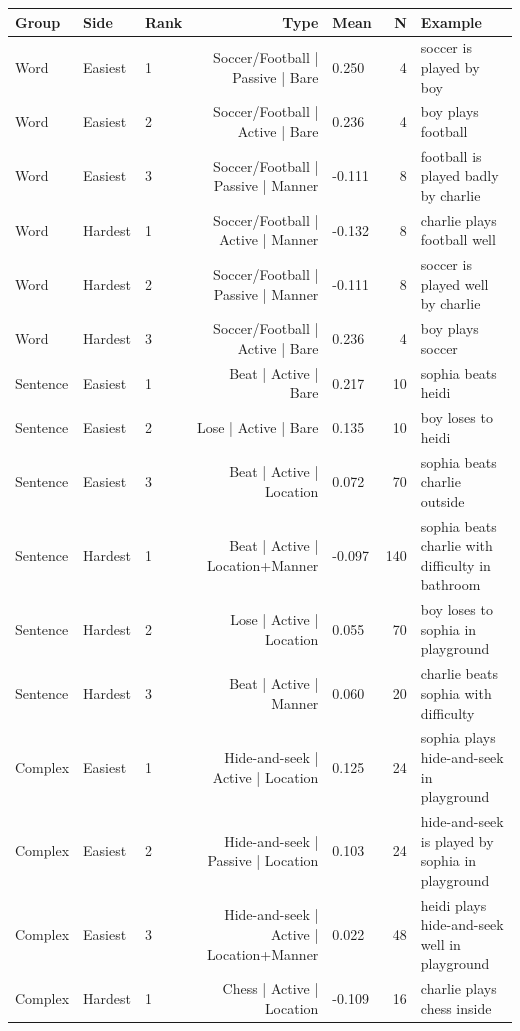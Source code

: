 \begin{table}[t]
\centering\scriptsize
\begin{tabular}{@{}lllrlrl@{}}
\toprule
\textbf{Group} & \textbf{Side} & \textbf{Rank} & \textbf{Type} & \textbf{Mean} & \textbf{N} & \textbf{Example}
\\
\midrule
Word & Easiest & 1 & Soccer/Football | Passive | Bare & 0.250 & 4 & soccer is played by boy
\\
Word & Easiest & 2 & Soccer/Football | Active | Bare & 0.236 & 4 & boy plays football
\\
Word & Easiest & 3 & Soccer/Football | Passive | Manner & -0.111 & 8 & football is played badly by charlie
\\
Word & Hardest & 1 & Soccer/Football | Active | Manner & -0.132 & 8 & charlie plays football well
\\
Word & Hardest & 2 & Soccer/Football | Passive | Manner & -0.111 & 8 & soccer is played well by charlie
\\
Word & Hardest & 3 & Soccer/Football | Active | Bare & 0.236 & 4 & boy plays soccer
\\
Sentence & Easiest & 1 & Beat | Active | Bare & 0.217 & 10 & sophia beats heidi
\\
Sentence & Easiest & 2 & Lose | Active | Bare & 0.135 & 10 & boy loses to heidi
\\
Sentence & Easiest & 3 & Beat | Active | Location & 0.072 & 70 & sophia beats charlie outside
\\
Sentence & Hardest & 1 & Beat | Active | Location+Manner & -0.097 & 140 & sophia beats charlie with difficulty in bathroom
\\
Sentence & Hardest & 2 & Lose | Active | Location & 0.055 & 70 & boy loses to sophia in playground
\\
Sentence & Hardest & 3 & Beat | Active | Manner & 0.060 & 20 & charlie beats sophia with difficulty
\\
Complex & Easiest & 1 & Hide-and-seek | Active | Location & 0.125 & 24 & sophia plays hide-and-seek in playground
\\
Complex & Easiest & 2 & Hide-and-seek | Passive | Location & 0.103 & 24 & hide-and-seek is played by sophia in playground
\\
Complex & Easiest & 3 & Hide-and-seek | Active | Location+Manner & 0.022 & 48 & heidi plays hide-and-seek well in playground
\\
Complex & Hardest & 1 & Chess | Active | Location & -0.109 & 16 & charlie plays chess inside
\\

\end{tabular}
\end{table}
